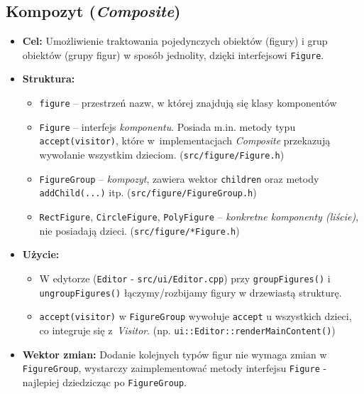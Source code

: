\documentclass[a4paper,12pt]{article}
\begin{document}
\subsection{Kompozyt (\emph{Composite})}
\begin{itemize}
    \item \textbf{Cel:} Umożliwienie traktowania pojedynczych obiektów
    (figury) i grup obiektów (grupy figur) w sposób jednolity, dzięki interfejsowi
    \texttt{Figure}. 
    \item \textbf{Struktura:} 
    \begin{itemize}
      \item \texttt{figure} -- przestrzeń nazw, w której znajdują się klasy komponentów
      \item \texttt{Figure} -- interfejs \emph{komponentu}. Posiada m.in. metody typu 
      \texttt{accept(visitor)}, które w~implementacjach \emph{Composite} przekazują
        wywołanie wszystkim dzieciom. (\verb|src/figure/Figure.h|)
      \item \texttt{FigureGroup} -- \emph{kompozyt}, zawiera wektor \texttt{children}
      oraz metody \texttt{addChild(...)} itp. (\verb|src/figure/FigureGroup.h|)
      \item \texttt{RectFigure}, \texttt{CircleFigure}, \texttt{PolyFigure} -- 
      \emph{konkretne komponenty (liście)}, nie posiadają dzieci. (\verb|src/figure/*Figure.h|)
    \end{itemize}
    \item \textbf{Użycie:} 
    \begin{itemize}
      \item W edytorze (\texttt{Editor} - \verb|src/ui/Editor.cpp|) przy \texttt{groupFigures()} i \texttt{ungroupFigures()}
      łączymy/rozbijamy figury w drzewiastą strukturę.
      \item \texttt{accept(visitor)} w \texttt{FigureGroup} wywołuje
        \texttt{accept} u wszystkich dzieci, co integruje się z~\emph{Visitor}. (np. \verb|ui::Editor::renderMainContent()|)
    \end{itemize}
    \item \textbf{Wektor zmian:} Dodanie kolejnych typów figur nie wymaga zmian
      w \texttt{FigureGroup}, wystarczy zaimplementować metody interfejsu 
      \texttt{Figure} - najlepiej dziedzicząc po \texttt{FigureGroup}.
\end{itemize}
\end{document}
